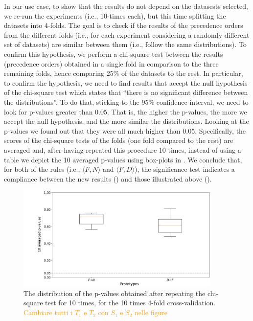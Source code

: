\begin{example}
In our use case, to show that the results do not depend on the datasests selected, we re-run the experiments (i.e., 10-times each), but this time splitting the datasets into 4-folds.
The goal is to check if the results of the precedence orders from the different folds (i.e., for each experiment considering a randomly different set of datasets) are similar between them (i.e., follow the same distributions).
To confirm this hypothesis, we perform a chi-square test between the results (precedence orders) obtained in a single fold in comparison to the three remaining folds, hence comparing $25$\% of the datasets to the rest.
In particular, to confirm the hypothesis, we need to find results that accept the null hypothesis of the chi-square test which states that ``there is no significant difference between the distributions''.
To do that, sticking to the $95$\% confidence interval, we need to look for p-values greater than $0.05$.
That is, the higher the p-values, the more we accept the null hypothesis, and the more similar the distributions.
Looking at the p-values we found out that they were all much higher than $0.05$.
Specifically, the scores of the chi-square tests of the folds (one fold compared to the rest) are averaged and, after having repeated this procedure 10 times, instead of using a table we depict the 10 averaged p-values using box-plots in .
We conclude that, for both of the rules (i.e.,  $\langle F, N \rangle$ and $\langle F, D \rangle$), the significance test indicates a compliance between the new results () and those illustrated above ().

\begin{figure}[!t]
	\centering
	\includegraphics[width=0.9\textwidth]{chapters/data-centric/supervised/img/10_times_4_folds_cv.pdf}
	\caption{The distribution of the p-values obtained after repeating the chi-square test for 10 times, for the 10 times 4-fold cross-validation. \textcolor{orange}{Cambiare tutti i $T_1$ e $T_2$ con $S_1$ e $S_2$ nelle figure}}
	\label{fig:10-times-4-cv}
\end{figure}


\end{example}
